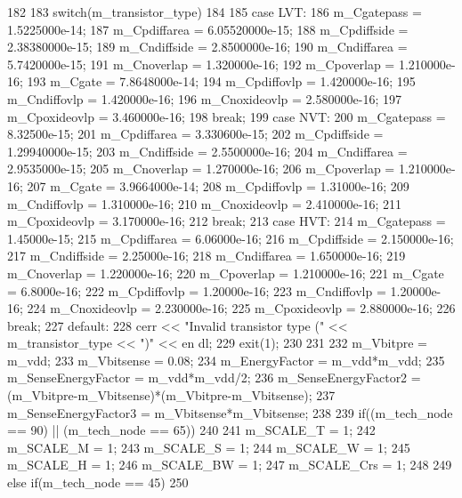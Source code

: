 \begin{DoxyCode}
182 {
183     switch(m_transistor_type)
184     {
185         case LVT:
186             m_Cgatepass = 1.5225000e-14;
187             m_Cpdiffarea = 6.05520000e-15;
188             m_Cpdiffside = 2.38380000e-15;
189             m_Cndiffside = 2.8500000e-16; 
190             m_Cndiffarea = 5.7420000e-15;
191             m_Cnoverlap = 1.320000e-16;
192             m_Cpoverlap = 1.210000e-16;
193             m_Cgate = 7.8648000e-14;
194             m_Cpdiffovlp = 1.420000e-16;
195             m_Cndiffovlp = 1.420000e-16;
196             m_Cnoxideovlp = 2.580000e-16;
197             m_Cpoxideovlp = 3.460000e-16;
198             break;
199         case NVT:
200             m_Cgatepass = 8.32500e-15;
201             m_Cpdiffarea = 3.330600e-15;
202             m_Cpdiffside = 1.29940000e-15;
203             m_Cndiffside = 2.5500000e-16;
204             m_Cndiffarea = 2.9535000e-15;
205             m_Cnoverlap = 1.270000e-16;
206             m_Cpoverlap = 1.210000e-16;
207             m_Cgate = 3.9664000e-14;
208             m_Cpdiffovlp = 1.31000e-16;
209             m_Cndiffovlp = 1.310000e-16;
210             m_Cnoxideovlp = 2.410000e-16;  
211             m_Cpoxideovlp = 3.170000e-16;
212             break;
213         case HVT:
214             m_Cgatepass = 1.45000e-15;
215             m_Cpdiffarea = 6.06000e-16;
216             m_Cpdiffside = 2.150000e-16;
217             m_Cndiffside = 2.25000e-16;  
218             m_Cndiffarea = 1.650000e-16;
219             m_Cnoverlap = 1.220000e-16;
220             m_Cpoverlap = 1.210000e-16;
221             m_Cgate = 6.8000e-16;
222             m_Cpdiffovlp = 1.20000e-16;
223             m_Cndiffovlp = 1.20000e-16;
224             m_Cnoxideovlp = 2.230000e-16;
225             m_Cpoxideovlp = 2.880000e-16;
226             break;
227         default:
228             cerr << "Invalid transistor type (" << m_transistor_type << ")" << en
      dl;
229             exit(1);
230     }
231 
232     m_Vbitpre = m_vdd;
233     m_Vbitsense = 0.08;
234     m_EnergyFactor = m_vdd*m_vdd;
235     m_SenseEnergyFactor = m_vdd*m_vdd/2;
236     m_SenseEnergyFactor2 = (m_Vbitpre-m_Vbitsense)*(m_Vbitpre-m_Vbitsense);
237     m_SenseEnergyFactor3 = m_Vbitsense*m_Vbitsense;
238 
239     if((m_tech_node == 90) || (m_tech_node == 65))
240     {
241         m_SCALE_T = 1;
242         m_SCALE_M = 1;
243         m_SCALE_S = 1;
244         m_SCALE_W = 1;
245         m_SCALE_H = 1;
246         m_SCALE_BW = 1;
247         m_SCALE_Crs = 1;
248     }
249     else if(m_tech_node == 45)
250     {
}}
\end{DoxyCode}
